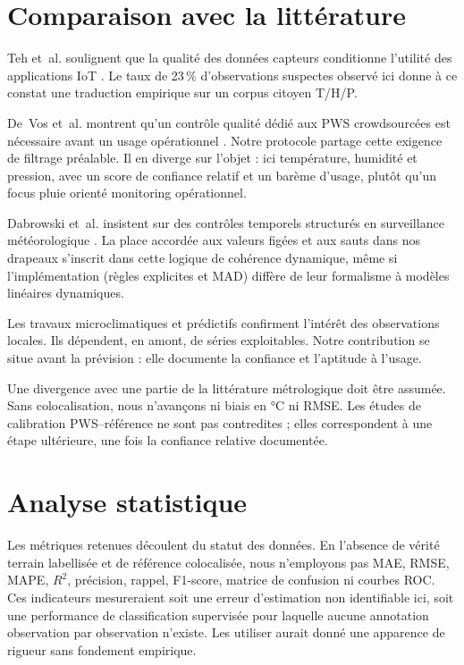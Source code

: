 \section{Comparaison avec la littérature}
\label{sec:litterature_comp}

Teh et~al. soulignent que la qualité des données capteurs conditionne l'utilité
des applications IoT \cite{teh2020sensor}. Le taux de 23\,\% d'observations
suspectes observé ici donne à ce constat une traduction empirique sur un corpus
citoyen T/H/P.

De~Vos et~al. montrent qu'un contrôle qualité dédié aux PWS crowdsourcées est
nécessaire avant un usage opérationnel \cite{devos2019qc}. Notre protocole
partage cette exigence de filtrage préalable. Il en diverge sur l'objet : ici
température, humidité et pression, avec un score de confiance relatif et un
barème d'usage, plutôt qu'un focus pluie orienté monitoring opérationnel.

Dabrowski et~al. insistent sur des contrôles temporels structurés en
surveillance météorologique \cite{dabrowski2022qc}. La place accordée aux
valeurs figées et aux sauts dans nos drapeaux s'inscrit dans cette logique de
cohérence dynamique, même si l'implémentation (règles explicites et MAD)
diffère de leur formalisme à modèles linéaires dynamiques.

Les travaux microclimatiques et prédictifs
\cite{moon2017microclimate,chithrakumar2023microclimate,yu2021lstm} confirment
l'intérêt des observations locales. Ils dépendent, en amont, de séries
exploitables. Notre contribution se situe avant la prévision : elle documente
la confiance et l'aptitude à l'usage.

Une divergence avec une partie de la littérature métrologique doit être
assumée. Sans colocalisation, nous n'avançons ni biais en °C ni RMSE. Les
études de calibration PWS--référence ne sont pas contredites ; elles
correspondent à une étape ultérieure, une fois la confiance relative
documentée.

\section{Analyse statistique}
\label{sec:stats}

Les métriques retenues découlent du statut des données. En l'absence de vérité
terrain labellisée et de référence colocalisée, nous n'employons pas MAE, RMSE,
MAPE, $R^2$, précision, rappel, F1-score, matrice de confusion ni courbes ROC.
Ces indicateurs mesureraient soit une erreur d'estimation non identifiable ici,
soit une performance de classification supervisée pour laquelle aucune
annotation observation par observation n'existe. Les utiliser aurait donné une
apparence de rigueur sans fondement empirique.

